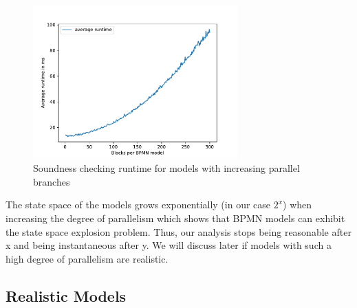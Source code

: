 \documentclass[runningheads]{llncs}
\begin{document}
\begin{figure}[ht]
	\centering
	\includegraphics[width=0.7\textwidth]{images/model-size-benchmark}
	\caption{Soundness checking runtime for models with increasing parallel branches}
	\label{fig:parallel-branches-benchmark}
\end{figure}

The state space of the models grows exponentially (in our case $2^x$) when increasing the degree of parallelism which shows that BPMN models can exhibit the state space explosion problem. %
Thus, our analysis stops being reasonable after x and being instantaneous after y.
We will discuss later if models with such a high degree of parallelism are realistic.

\subsection{Realistic Models} \label{subsec:industrial-models}

\end{document}
